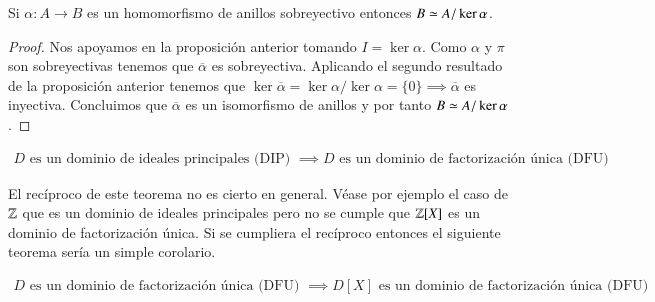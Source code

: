 \begin{thm}
	Si $\alpha: A \to B$ es un homomorfismo de anillos sobreyectivo entonces $B \simeq A / \ker \alpha$.
\end{thm}

\begin{figure}[h]
	\centering
\end{figure}

\begin{proof}
	Nos apoyamos en la proposición anterior tomando $I = \ker \alpha$. Como $\alpha$ y $\pi$ son sobreyectivas tenemos que $\overline{\alpha}$ es sobreyectiva. Aplicando el segundo resultado de la proposición anterior tenemos que $\ker \overline{\alpha} = \ker \alpha / \ker \alpha = \{ 0\} \implies \overline{\alpha}$ es inyectiva. Concluimos que $\overline{\alpha}$ es un isomorfismo de anillos y por tanto $B \simeq A / \ker \alpha$.
\end{proof}


\begin{thm}
	\begin{align*}
	D \text{ es un dominio de ideales principales (DIP) } \implies D \text{ es un dominio de factorización única (DFU)}
	\end{align*}
\end{thm}

El recíproco de este teorema no es cierto en general. Véase por ejemplo el caso de $\mathbb{Z}$ que es un dominio de ideales principales pero no se cumple que $\mathbb{Z}[X]$ es un dominio de factorización única. Si se cumpliera el recíproco entonces el siguiente teorema sería un simple corolario.

\begin{thm}
	\begin{align*}
	D \text{ es un dominio de factorización única (DFU) } \implies D[X] \text{ es un dominio de factorización única (DFU)}
	\end{align*}
\end{thm}

